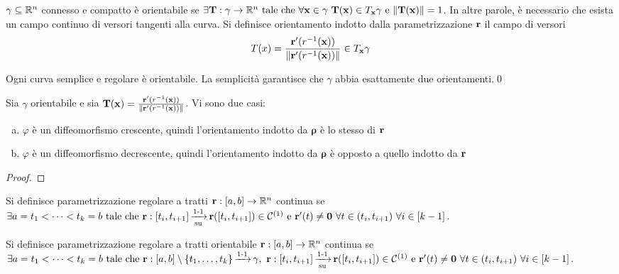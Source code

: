 \begin{definition}
	$\gamma \subseteq \mathbb{R}^n$ connesso e compatto è orientabile se $\exists \vb{T}: \gamma \to \mathbb{R}^n \text{ tale che } \forall \vb{x} \in \gamma \ \vb{T}(\vb{x})\in T_{\vb{x}}\gamma \text{ e } \norm{\vb{T}(\vb{x})}=1$. In altre parole, è necessario che esista un campo continuo di versori tangenti alla curva. Si definisce orientamento indotto dalla parametrizzazione $\vb{r}$ il campo di versori
	$$
		T(x)=\frac{\vb{r}'(r^{-1}(\vb{x}))}{\norm{\vb{r}'(r^{-1}(\vb{x}))}} \in T_{\vb{x}}\gamma
	$$
\end{definition}

\begin{lemma}
	Ogni curva semplice e regolare è orientabile. La semplicità garantisce che $\gamma$ abbia esattamente due orientamenti.\qed
\end{lemma}

\begin{theorem}
	Sia $\gamma$ orientabile e sia $\vb{T}(\vb{x})=\frac{\vb{r}'(r^{-1}(\vb{x}))}{\norm{\vb{r}'(r^{-1}(\vb{x}))}}$. Vi sono due casi:
	\begin{enumerate}[a.]
		\item $\varphi$ è un diffeomorfismo crescente, quindi l'orientamento indotto da $\bm\rho$ è lo stesso di $\vb{r}$
		\item $\varphi$ è un diffeomorfismo decrescente, quindi l'orientamento indotto da $\bm\rho$ è opposto a quello indotto da $\vb{r}$
	\end{enumerate}
\end{theorem}

\begin{proof}
\end{proof}

\begin{definition}
	Si definisce parametrizzazione regolare a tratti $\vb{r}:[a,b]\to \mathbb{R}^n$ continua se $\exists a=t_1<\cdots<t_k=b \text{ tale che } \vb{r}:[t_i, t_{i+1}]\operatorname{\xrightarrow[\operatorname{su}]{\operatorname{1-1}}} \vb{r}([t_i,t_{i+1}]) \in \mathcal{C}^{(1)} \text{ e } \vb{r}'(t)\neq \vb{0} \ \forall t \in (t_i,t_{i+1}) \ \forall i \in [k-1]$.
\end{definition}

\begin{definition}
	Si definisce parametrizzazione regolare a tratti orientabile $\vb{r}: [a,b]\to\mathbb{R}^n$ continua se $\exists a=t_1<\cdots<t_k=b \tc \vb{r}:[a,b]\setminus \{t_1,\dots,t_k\} \injarrow \gamma, \ \vb{r}:[t_i,t_{i+1}]\bijarrow \vb{r}([t_i,t_{i+1}]) \in \C{1} \e \vb{r}'(t)\neq \vb{0} \ \forall t \in (t_i,t_{i+1}) \ \forall i \in [k-1]$.
\end{definition}

